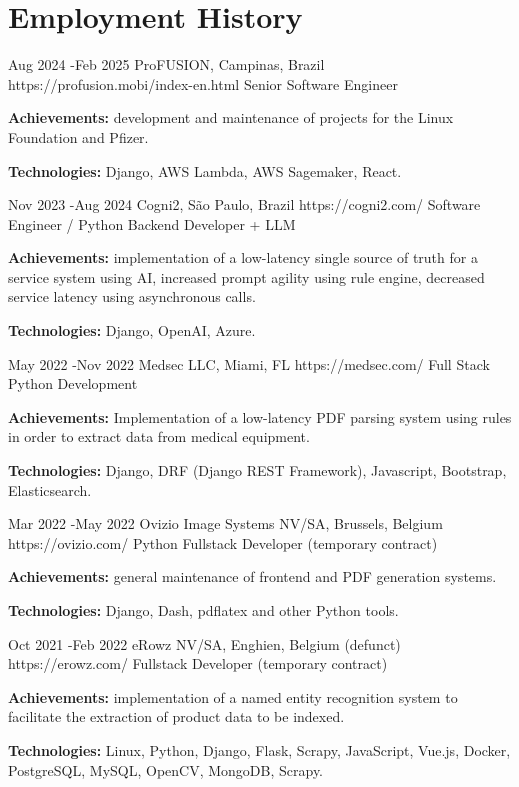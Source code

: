 \documentclass[10pt]{article} %
\begin{document}

\section{Employment History}

\job
{Aug 2024 -}{Feb 2025}
{ProFUSION, Campinas, Brazil}
{https://profusion.mobi/index-en.html}
{Senior Software Engineer}
{\rule{0mm}{2mm}\textbf{Achievements:} development and maintenance of projects for the Linux Foundation and Pfizer.\\
\rule{0mm}{3mm}\textbf{Technologies:} Django, AWS Lambda, AWS Sagemaker, React.}


\job
{Nov 2023 -}{Aug 2024}
{Cogni2, São Paulo, Brazil}
{https://cogni2.com/}
{Software Engineer / Python Backend Developer + LLM}
{\rule{0mm}{2mm}\textbf{Achievements:} implementation of a low-latency single source of truth for a service system using AI, increased prompt agility using rule engine, decreased service latency using asynchronous calls.\\
\rule{0mm}{3mm}\textbf{Technologies:} Django, OpenAI, Azure.}


\job
{May 2022 -}{Nov 2022}
{Medsec LLC, Miami, FL}
{https://medsec.com/}
{Full Stack Python Development}
{\rule{0mm}{2mm}\textbf{Achievements:} Implementation of a low-latency PDF parsing system using rules in order to extract data from medical equipment.\\
\rule{0mm}{3mm}\textbf{Technologies:} Django, DRF (Django REST Framework), Javascript, Bootstrap, Elasticsearch.}

\job
{Mar 2022 -}{May 2022}
{Ovizio Image Systems NV/SA, Brussels, Belgium}
{https://ovizio.com/}
{Python Fullstack Developer (temporary contract)}
{\rule{0mm}{2mm}\textbf{Achievements:} general maintenance of frontend and PDF generation systems.\\
\rule{0mm}{3mm}\textbf{Technologies:} Django, Dash, pdflatex and other Python tools.}

\job
{Oct 2021 -}{Feb 2022}
{eRowz  NV/SA, Enghien, Belgium (defunct)}
{https://erowz.com/}
{Fullstack Developer (temporary contract)}
{\rule{0mm}{2mm}\textbf{Achievements:} implementation of a named entity recognition system to facilitate the extraction of product data to be indexed.\\
\rule{0mm}{3mm}\textbf{Technologies:} Linux, Python, Django, Flask, Scrapy, JavaScript, Vue.js, Docker, PostgreSQL, MySQL, OpenCV, MongoDB, Scrapy.}
\end{document}
